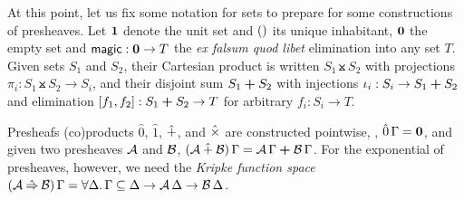 \documentclass[a4paper,USenglish,cleveref, autoref]{lipics-v2019}
\begin{document}
At this point, let us fix some notation for sets to prepare for some
constructions of presheaves.  Let $\mbox{\textbf{1}}$ denote the unit set and
$()$ its unique inhabitant, $\mbox{\textbf{0}}$ the empty set and
$\mathsf{magic} : \mbox{\textbf{0}} \to T$ the \emph{ex falsum quod libet} elimination
into any set $T$.  Given sets $S_1$ and $S_2$, their Cartesian product
is written $S_1 \btimes S_2$ with projections $\pi_i : S_1 \btimes S_2
\to S_i$, and their disjoint sum $S_1 \boldsymbol{+} S_2$ with injections
$\iota_i : S_i \to S_1 \boldsymbol{+} S_2$ and elimination $[f_1,f_2] : S_1 \boldsymbol{+}
S_2 \to T$ for arbitrary $f_i : S_i \to T$.

Presheafs (co)products $\hat0$, $\hat1$, $\mathbin{\hat+}$, and $\mathbin{\hat\times}$ are
constructed pointwise, \eg, $\hat0\,\Gamma = \mbox{\textbf{0}}$, and given two
presheaves $\mathcal{A}$ and $\mathcal{B}$,
$(\mathcal{A} \mathbin{\hat+} \mathcal{B})\,\Gamma = \mathcal{A}\,\Gamma \boldsymbol{+} \mathcal{B}\,\Gamma$.  For the
exponential of presheaves, however, we need the \emph{Kripke function
  space}
$(\mathcal{A} \mathbin{\hat{\Rightarrow}} \mathcal{B})\,\Gamma = \forall \Delta.\, \Gamma \subseteq \Delta
\to \mathcal{A}\,\Delta \to \mathcal{B}\,\Delta$.
\end{document}
